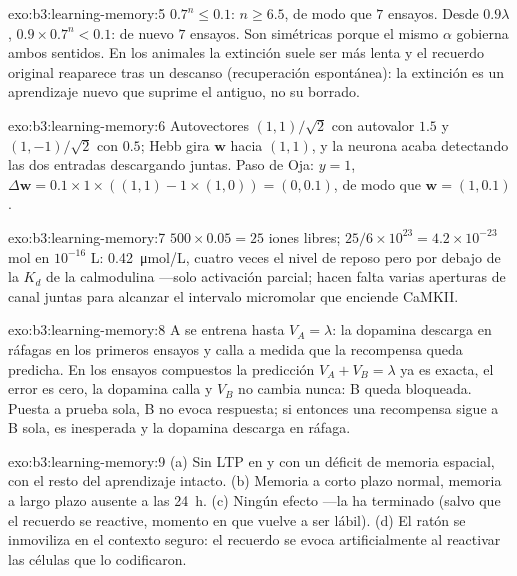 \begin{solution}{exo:b3:learning-memory:5}
$0.7^{n} \le 0.1$: $n \ge 6.5$, de modo que $7$ ensayos. Desde
$0.9\lambda$, $0.9\times 0.7^{n} < 0.1$: de nuevo $7$ ensayos. Son
simétricas porque el mismo $\alpha$ gobierna ambos sentidos. En los
animales la extinción suele ser más lenta y el recuerdo original
reaparece tras un descanso (recuperación espontánea): la extinción es
un aprendizaje nuevo que suprime el antiguo, no su borrado.
\end{solution}

\begin{solution}{exo:b3:learning-memory:6}
Autovectores $(1,1)/\sqrt{2}$ con autovalor $1.5$ y $(1,-1)/\sqrt{2}$
con $0.5$; Hebb gira $\mathbf{w}$ hacia $(1,1)$, y la neurona acaba
detectando las dos entradas descargando juntas. Paso de Oja: $y = 1$,
$\Delta\mathbf{w} = 0.1\times 1\times((1,1) - 1\times(1,0)) = (0,0.1)$,
de modo que $\mathbf{w} = (1, 0.1)$.
\end{solution}

\begin{solution}{exo:b3:learning-memory:7}
$500\times 0.05 = 25$ iones libres; $25/6\times 10^{23} = 4.2\times 10^{-23}$
mol en $10^{-16}$ L: \qty{0.42}{\micro mol/L}, cuatro veces el nivel de
reposo pero por debajo de la $K_{d}$ de la calmodulina ---solo
activación parcial; hacen falta varias aperturas de canal juntas para
alcanzar el intervalo micromolar que enciende CaMKII.
\end{solution}

\begin{solution}{exo:b3:learning-memory:8}
A se entrena hasta $V_{A} = \lambda$: la dopamina descarga en ráfagas en
los primeros ensayos y calla a medida que la recompensa queda predicha.
En los ensayos compuestos la predicción $V_{A} + V_{B} = \lambda$ ya es
exacta, el error es cero, la dopamina calla y $V_{B}$ no cambia nunca:
B queda bloqueada. Puesta a prueba sola, B no evoca respuesta; si
entonces una recompensa sigue a B sola, es inesperada y la dopamina
descarga en ráfaga.
\end{solution}

\begin{solution}{exo:b3:learning-memory:9}
(a) Sin LTP en  y con un déficit de memoria espacial, con el resto
del aprendizaje intacto. (b) Memoria a corto plazo normal, memoria a
largo plazo ausente a las \qty{24}{h}. (c) Ningún efecto ---la
 ha terminado (salvo que el recuerdo se reactive, momento
en que vuelve a ser lábil). (d) El ratón se inmoviliza en el contexto
seguro: el recuerdo se evoca artificialmente al reactivar las células
que lo codificaron.
\end{solution}

